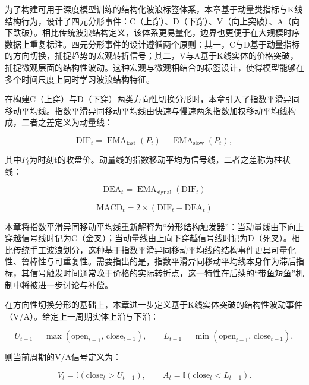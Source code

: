 为了构建可用于深度模型训练的结构化波浪标签体系，本章基于动量类指标与K线结构行为，设计了四元分形事件：C（上穿）、D（下穿）、V（向上突破）、A（向下跌破）。相比传统波浪结构定义，该体系更易量化，边界也更便于在大规模时序数据上重复标注。四元分形事件的设计遵循两个原则：其一，C与D基于动量指标的方向切换，捕捉趋势的宏观转折信号；其二，V与A基于K线实体的价格突破，捕捉微观层面的结构性波动。这种宏观与微观相结合的标签设计，使得模型能够在多个时间尺度上同时学习波浪结构特征。

在构建C（上穿）与D（下穿）两类方向性切换分形时，本章引入了指数平滑异同移动平均线。指数平滑异同移动平均线由快速与慢速两条指数加权移动平均线构成，二者之差定义为动量线：

\begin{equation}
\mathrm{DIF}_t = \operatorname{EMA}_{\text{fast}}(P_t) - \operatorname{EMA}_{\text{slow}}(P_t),
\end{equation}

其中$P_t$为时刻t的收盘价。动量线的指数移动平均为信号线，二者之差称为柱状线：

\begin{equation} \mathrm{DEA}_t = \operatorname{EMA}_{\text{signal}}(\mathrm{DIF}_t) \label{eq:dea} \end{equation}

\begin{equation} \mathrm{MACD}_t = 2 \times (\mathrm{DIF}_t - \mathrm{DEA}_t) \label{eq:macd} \end{equation}

本章将指数平滑异同移动平均线重新解释为``分形结构触发器''：当动量线由下向上穿越信号线时记为C（金叉）；当动量线由上向下穿越信号线时记为D（死叉）。相比传统手工波浪划分，这种基于指数平滑异同移动平均线的结构事件更具可量化性、鲁棒性与可重复性。需要指出的是，指数平滑异同移动平均线本身作为滞后指标，其信号触发时间通常晚于价格的实际转折点，这一特性在后续的``带鱼短鱼''机制中将被进一步讨论与补偿。

在方向性切换分形的基础上，本章进一步定义基于K线实体突破的结构性波动事件（V/A）。给定上一周期实体上沿与下沿：

\begin{equation}
U_{t-1} = \max(\mathrm{open}_{t-1},\, \mathrm{close}_{t-1}),
\qquad
L_{t-1} = \min(\mathrm{open}_{t-1},\, \mathrm{close}_{t-1}),
\end{equation}

则当前周期的V/A信号定义为：

\begin{equation}
V_t = \mathbb{I}(\mathrm{close}_t > U_{t-1}),
\qquad
A_t = \mathbb{I}(\mathrm{close}_t < L_{t-1}).
\end{equation}

